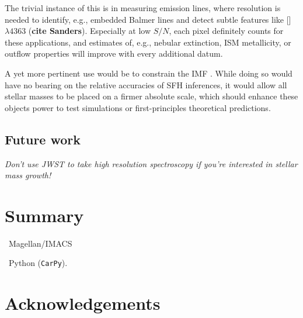 \documentclass[a4paper,fleqn,usenatbib]{mnras}
\newcommand{\bfr}{\bf\color{red}}
\newcommand{\facilities}{{\it Facilities:}}
\newcommand{\software}{{\it Software:}}
\begin{document}
The trivial instance of this is in measuring emission lines, where resolution is needed to 
identify, e.g., embedded Balmer lines and detect subtle features like [] 
$\lambda4363$ ({\bfr cite Sanders}). Especially at low $S/N$, each pixel definitely counts
for these applications, and estimates of, e.g., nebular extinction, ISM metallicity, or outflow
properties will improve with every additional datum.

A yet more pertinent use would be to constrain the IMF \citep{Conroy12}. While doing so 
would have no bearing on the relative accuracies of SFH inferences, it would allow all stellar 
masses to be placed on a firmer absolute scale, which should enhance these objects power to test 
simulations or first-principles theoretical predictions. %
\fi

\subsection{Future work}
\label{sec:future}

{\it Don't use JWST to take high resolution spectroscopy if you're interested in stellar mass growth!}


\section{Summary}
\label{sec:summary}



\noindent\facilities\ Magellan/IMACS

\noindent\software\ Python (\texttt{CarPy}).%


\section*{Acknowledgements}
\end{document}
